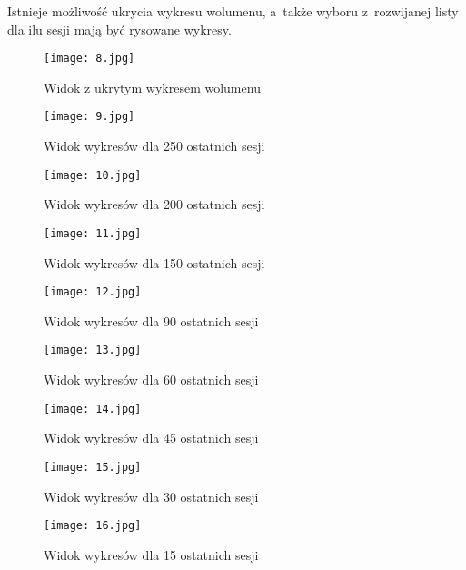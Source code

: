 Istnieje możliwość ukrycia wykresu wolumenu, a~także wyboru z~rozwijanej listy dla ilu sesji mają być rysowane wykresy.

\begin{figure}[H]
	\centering
	\texttt{[image: 8.jpg]}
	\caption{Widok z ukrytym wykresem wolumenu}
	\label{fig:8}
\end{figure}

\begin{figure}[H]
	\centering
	\texttt{[image: 9.jpg]}
	\caption{Widok wykresów dla 250 ostatnich sesji}
	\label{fig:9}
\end{figure}

\begin{figure}[H]
	\centering
	\texttt{[image: 10.jpg]}
	\caption{Widok wykresów dla 200 ostatnich sesji}
	\label{fig:10}
\end{figure}

\begin{figure}[H]
	\centering
	\texttt{[image: 11.jpg]}
	\caption{Widok wykresów dla 150 ostatnich sesji}
	\label{fig:11}
\end{figure}

\begin{figure}[H]
	\centering
	\texttt{[image: 12.jpg]}
	\caption{Widok wykresów dla 90 ostatnich sesji}
	\label{fig:12}
\end{figure}

\begin{figure}[H]
	\centering
	\texttt{[image: 13.jpg]}
	\caption{Widok wykresów dla 60 ostatnich sesji}
	\label{fig:13}
\end{figure}

\begin{figure}[H]
	\centering
	\texttt{[image: 14.jpg]}
	\caption{Widok wykresów dla 45 ostatnich sesji}
	\label{fig:14}
\end{figure}

\begin{figure}[H]
	\centering
	\texttt{[image: 15.jpg]}
	\caption{Widok wykresów dla 30 ostatnich sesji}
	\label{fig:15}
\end{figure}

\begin{figure}[H]
	\centering
	\texttt{[image: 16.jpg]}
	\caption{Widok wykresów dla 15 ostatnich sesji}
	\label{fig:16}
\end{figure}

